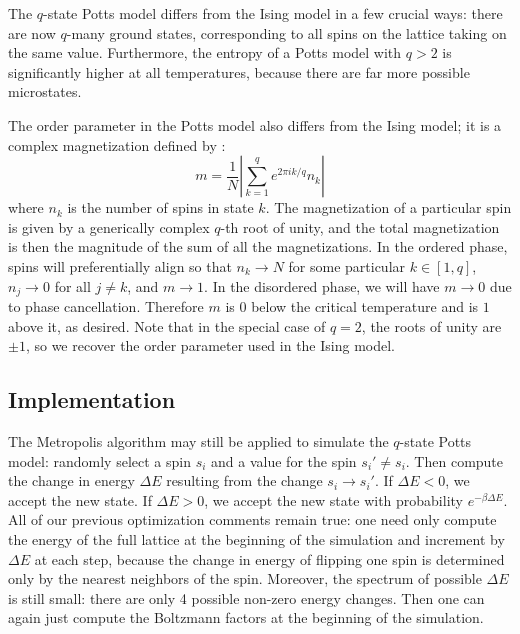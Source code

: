 \documentclass[twocolumn,aps]{revtex4-1} %
\begin{document}
The $q$-state Potts model differs from the Ising model in a few crucial ways: there are now $q$-many ground states, corresponding to all spins on the lattice taking on the same value. Furthermore, the entropy of a Potts model with $q > 2$ is significantly higher at all temperatures, because there are far more possible microstates.

The order parameter in the Potts model also differs from the Ising model; it is a complex magnetization defined by \cite{potts}:
\begin{equation}
	m = \frac{1}{N}\left|\sum_{k=1}^qe^{2\pi i k/q}n_k\right|
\end{equation}
where $n_k$ is the number of spins in state $k$. The magnetization of a particular spin is given by a generically complex $q$-th root of unity, and the total magnetization is then the magnitude of the sum of all the magnetizations. In the ordered phase, spins will preferentially align so that $n_k \to N$ for some particular $k \in [1,q]$, $n_j \to 0$ for all $j \neq k$, and $m \to 1$. In the disordered phase, we will have $m \to 0$ due to phase cancellation. Therefore $m$ is 0 below the critical temperature and is $1$ above it, as desired. Note that in the special case of $q = 2$, the roots of unity are $\pm 1$, so we recover the order parameter used in the Ising model.


\subsection{Implementation}
The Metropolis algorithm may still be applied to simulate the $q$-state Potts model: randomly select a spin $s_i$ and a value for the spin $s_i' \neq s_i$. Then compute the change in energy $\Delta E$ resulting from the change $s_i \to s_i'$. If $\Delta E < 0$, we accept the new state. If $\Delta E > 0$, we accept the new state with probability $e^{-\beta \Delta E}$. All of our previous optimization comments remain true: one need only compute the energy of the full lattice at the beginning of the simulation and increment by $\Delta E$ at each step, because the change in energy of flipping one spin is determined only by the nearest neighbors of the spin. Moreover, the spectrum of possible $\Delta E$ is still small: there are only 4 possible non-zero energy changes. Then one can again just compute the Boltzmann factors at the beginning of the simulation.
\end{document}
